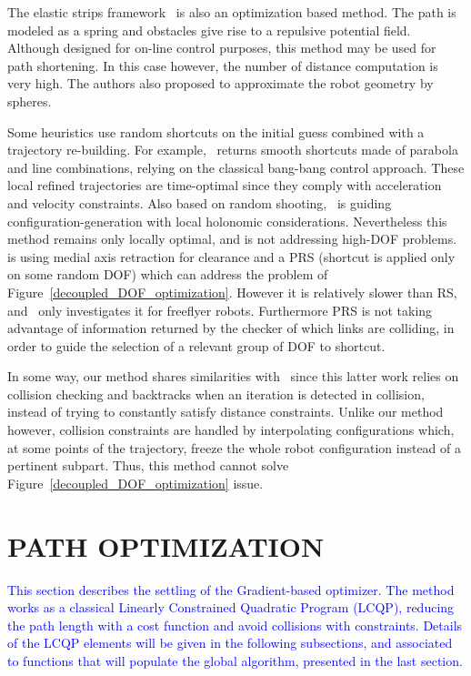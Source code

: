 \documentclass{tADR2e}
\begin{document}
The elastic strips framework~\cite{BrockElasticStrips} is also an optimization 
based method. The path is modeled as a spring and obstacles give rise to a 
repulsive potential field. Although designed for on-line control purposes, this 
method may be used for path shortening. In this case however, the number of 
distance computation is very high. The authors also proposed to approximate the 
robot geometry by spheres.

Some heuristics use random shortcuts on the initial guess combined with a 
trajectory re-building. For example,~\cite{HauserFastSmooth} returns smooth shortcuts made of parabola and line combinations, relying on the classical bang-bang control approach. These local refined trajectories 
are time-optimal since they comply with acceleration and velocity constraints. 
Also based on random shooting,~\cite{Guernane2011} is guiding 
configuration-generation with local holonomic considerations. 
Nevertheless this method remains only 
locally optimal, and is not addressing high-DOF 
problems.~\cite{GeraertsIJRR07} is 
using medial axis retraction for clearance and a PRS (shortcut is applied only 
on some random DOF) 
which can address the problem of Figure~\ref{decoupled_DOF_optimization}. 
However it is 
relatively slower than RS, and~\cite{GeraertsIJRR07} only investigates 
it for freeflyer robots. 
Furthermore PRS is not taking advantage of information returned by 
the checker of which links are colliding, in order to guide the selection of a relevant group of DOF to shortcut.

In some way, our method shares similarities with~\cite{PanSmoothSplineShort} 
since this latter work relies on collision checking and backtracks when an 
iteration is detected in collision, instead of trying to constantly satisfy 
distance constraints. Unlike our method however, collision constraints are 
handled by interpolating configurations which, at some points of the trajectory, 
freeze the whole robot configuration instead of a pertinent subpart. Thus, this 
method cannot solve Figure~\ref{decoupled_DOF_optimization} issue.


\section{PATH OPTIMIZATION} \label{section:path_optim}

\textcolor{blue}{This section describes the settling of the Gradient-based optimizer. The method works as a classical Linearly Constrained Quadratic Program (LCQP), reducing the path length with a cost function and avoid collisions with constraints. Details of the LCQP elements will be given in the following subsections, and associated to functions that will populate the global algorithm, presented in the last section.}
\end{document}
